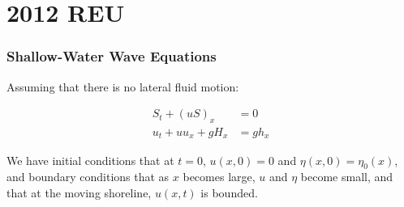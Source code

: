 


\section{2012 REU}
	\begin{frame}
		\frametitle{Shallow-Water Wave Equations}
		Assuming that there is no lateral fluid motion:
		\begin{framed} \begin{align}
			\label{swe1} S_t + (uS)_x &= 0\\
			\label{swe2} u_t + u u_x + g H_x &= g h_x
		\end{align} \end{framed}
		We have initial conditions that at $t=0$, $u(x,0) = 0$ and $\eta(x,0) = \eta_0(x)$, and boundary conditions that as $x$ becomes large, $u$ and $\eta$ become small, and that at the moving shoreline, $u(x,t)$ is bounded.
	\end{frame}

